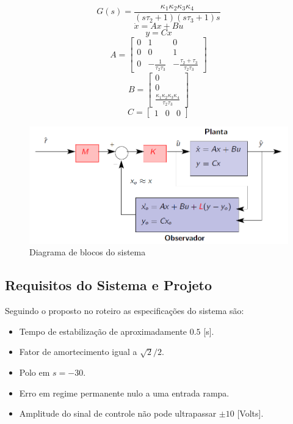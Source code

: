 \documentclass{article}
\begin{document}
\begin{equation}
\label{eq:gs}
G(s) = \frac{\kappa_1\kappa_2\kappa_3\kappa_4}{(s\tau_2 + 1)(s\tau_3 + 1)s}
\end{equation}
\begin{equation}
\label{eq:ssxdot}
\dot{x}=Ax+Bu
\end{equation}
\begin{equation}
\label{eq:ssy}
y=Cx
\end{equation}
\begin{equation}
\label{eq:mata}
A=
\begin{bmatrix}
 0 & 1 & 0 \\
 0 & 0 & 1 \\
 0 & -\frac{1}{\tau_2\tau_3} & -\frac{\tau_2+\tau_3}{\tau_2\tau_3}
\end{bmatrix}
\end{equation}
\begin{equation}
\label{eq:matb}
B=
\begin{bmatrix}
0 \\
0 \\
\frac{\kappa_1\kappa_2\kappa_3\kappa_4}{\tau_2\tau_3}
\end{bmatrix}
\end{equation}
\begin{equation}
\label{eq:matc}
C=
\begin{bmatrix}
1 & 0 & 0
\end{bmatrix}
\end{equation}

\begin{figure}[H]
	\centering
	\includegraphics[width=0.8\linewidth]{contrss}
	\caption{Diagrama de blocos do sistema}
	\label{fig:contrss}
\end{figure}

\subsection{Requisitos do Sistema e Projeto}
Seguindo o proposto no roteiro \cite{bb:roteiro} as especificações do sistema são:
\begin{itemize}
	\item Tempo de estabilização de aproximadamente $0.5$ [s].
	\item Fator de amortecimento igual a $\sqrt{2}/2$.
	\item Polo em $s=-30$.
	\item Erro em regime permanente nulo a uma entrada rampa.
	\item Amplitude do sinal de controle não pode ultrapassar $\pm10$ [Volts].
\end{itemize}\
\end{document}
